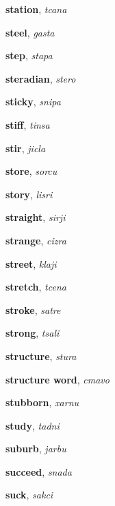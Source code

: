 \documentclass[12pt]{book}
\begin{document}
\begin{description}
\item[ ] \textbf{station}, \textit{tcana}

\item[ ] \textbf{steel}, \textit{gasta}

\item[ ] \textbf{step}, \textit{stapa}

\item[ ] \textbf{steradian}, \textit{stero}

\item[ ] \textbf{sticky}, \textit{snipa}

\item[ ] \textbf{stiff}, \textit{tinsa}

\item[ ] \textbf{stir}, \textit{jicla}

\item[ ] \textbf{store}, \textit{sorcu}

\item[ ] \textbf{story}, \textit{lisri}

\item[ ] \textbf{straight}, \textit{sirji}

\item[ ] \textbf{strange}, \textit{cizra}

\item[ ] \textbf{street}, \textit{klaji}

\item[ ] \textbf{stretch}, \textit{tcena}

\item[ ] \textbf{stroke}, \textit{satre}

\item[ ] \textbf{strong}, \textit{tsali}

\item[ ] \textbf{structure}, \textit{stura}

\item[ ] \textbf{structure word}, \textit{cmavo}

\item[ ] \textbf{stubborn}, \textit{xarnu}

\item[ ] \textbf{study}, \textit{tadni}

\item[ ] \textbf{suburb}, \textit{jarbu}

\item[ ] \textbf{succeed}, \textit{snada}

\item[ ] \textbf{suck}, \textit{sakci}


\end{description}
\end{document}

